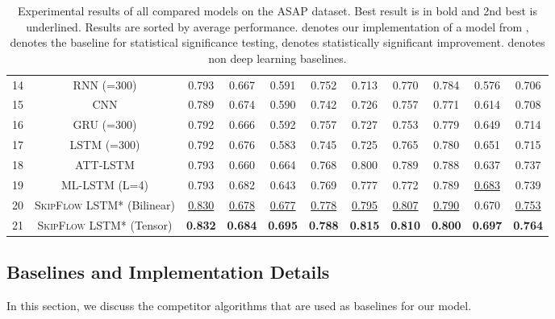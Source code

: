\documentclass[letterpaper]{article}
\begin{document}
\begin{table*}[ht]
\begin{tabular}{|c|c|cccccccc|c|}
      
         14 & RNN (=300)  & 0.793  & 0.667 &0.591  &0.752 & 0.713 & 0.770  & 0.784 & 0.576 & 0.706 \\
         15 & CNN & 0.789    & 0.674  & 0.590   & 0.742  & 0.726  & 0.757  & 0.771  &  0.614  & 0.708 \\ 

     16 & GRU (=300)  & 0.792 & 0.666 & 0.592 & 0.757   & 0.727 &  0.753 & 0.779 & 0.649 & 0.714 \\
     17 & LSTM (=300) & 0.792 & 0.676 & 0.583 & 0.745 & 0.725 & 0.765 & 0.780 & 0.651 & 0.715 \\
      18 &  ATT-LSTM  & 0.793  &  0.660  &  0.664  & 0.768  & 0.800 & 0.789 &   0.788  & 0.637 &  0.737    \\
     19 & ML-LSTM (L=4) & 0.793 &  0.682  & 0.643  &  0.769 &  0.777  & 0.772 &  0.789 &  \underline{0.683}  & 0.739 \\
     \hline
     20 & \textsc{SkipFlow} LSTM* (Bilinear) & \underline{0.830}  & \underline{0.678} & \underline{0.677} & \underline{0.778} & \underline{0.795} & \underline{0.807} & \underline{0.790}  & 0.670  & \underline{0.753} \\

     21 & \textsc{SkipFlow} LSTM* (Tensor) & \textbf{0.832} & \textbf{0.684} &    \textbf{0.695} &    \textbf{0.788} &    \textbf{0.815} &    \textbf{0.810} &    \textbf{0.800} &    \textbf{0.697} &    \textbf{0.764} \\
     \hline
     \end{tabular}\caption{Experimental results of all compared models on the ASAP dataset. Best result is in bold and 2nd best is underlined. Results are sorted by average performance.  denotes our implementation of a model from \cite{DBLP:conf/emnlp/TaghipourN16},  denotes the baseline for statistical significance testing,  denotes statistically significant improvement.  denotes non deep learning baselines. }
   \label{tab:single_mdls}\end{table*}

\subsection{Baselines and Implementation Details}

In this section, we discuss the competitor algorithms that are used as baselines for our model. 
\end{document}
